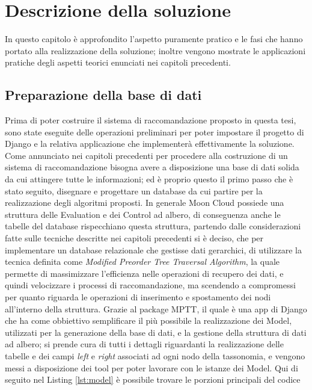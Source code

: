 \chapter{Descrizione della soluzione}\label{chp:04-solution}
In questo capitolo è approfondito l'aspetto puramente pratico e le fasi che hanno portato alla realizzazione della soluzione; 
inoltre vengono mostrate le applicazioni pratiche degli aspetti teorici enunciati nei capitoli precedenti.
\section*{Preparazione della base di dati}
Prima di poter costruire il sistema di raccomandazione proposto in questa tesi, sono state eseguite delle operazioni preliminari 
per poter impostare il progetto di Django e la relativa applicazione che implementerà effettivamente la soluzione.
%
Come annunciato nei capitoli precedenti per procedere alla costruzione di un sistema di raccomandazione bisogna avere a disposizione 
una base di dati solida da cui attingere tutte le informazioni; ed è proprio questo il primo passo che è stato seguito, disegnare 
e progettare un database da cui partire per la realizzazione degli algoritmi proposti.
In generale Moon Cloud possiede una struttura delle Evaluation e dei Control ad albero, di conseguenza anche le tabelle del database 
rispecchiano questa struttura, partendo dalle considerazioni fatte sulle tecniche descritte nei capitoli precedenti si è deciso, che 
per implementare un database relazionale che gestisse dati gerarchici, di utilizzare la tecnica
definita come \textit{Modified Preorder Tree Traversal Algorithm}, la quale permette di massimizzare l'efficienza nelle 
operazioni di recupero dei dati, e quindi velocizzare i processi di raccomandazione, ma scendendo a compromessi per quanto riguarda le 
operazioni di inserimento e spostamento dei nodi all'interno della struttura. 
Grazie al package MPTT, il quale è una app di Django che ha come obbiettivo semplificare il più possibile la realizzazione dei 
Model, utilizzati per la generazione della base di dati, e la 
gestione della struttura di dati ad albero; si prende cura di tutti i dettagli riguardanti la realizzazione delle tabelle e dei 
campi \textit{left} e \textit{right} associati ad ogni nodo della tassonomia, e vengono messi a disposizione dei tool per poter 
lavorare con le istanze dei Model. Qui di seguito nel Listing \ref{lst:model} è possibile trovare le porzioni principali del codice 
